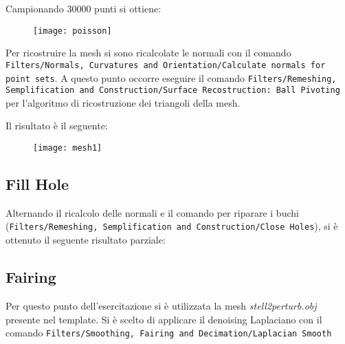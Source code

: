 Campionando 30000 punti si ottiene:
 \begin{figure}[htb]
    \centering
    \texttt{[image: poisson]}
    \caption{\label{fig:poisson}}
    \vspace{-0.3cm}
\end{figure}

Per ricostruire la mesh si sono ricalcolate le normali con il comando \texttt{Filters/\-Normals, \-Curvatures and \-Orientation/\-Calculate normals \-for \-point \-sets}. A questo punto occorre eseguire il comando \texttt{Filters/\-Remeshing, \-Semplification and \-Construction/\-Surface\- Recostruction\-: Ball \-Pivoting} per l'algoritmo di ricostruzione dei triangoli della mesh.

Il risultato è il seguente:
 \begin{figure}[htb]
    \centering
    \texttt{[image: mesh1]}
    \caption{\label{fig:mesh}}
    \vspace{-0.3cm}
\end{figure}

\subsection{Fill Hole}
Alternando il ricalcolo delle normali e il comando per riparare i buchi (\texttt{Filters/\-Remeshing, \-Semplification\- and \-Construction/Close Holes}), si è ottenuto il seguente risultato parziale:
\begin{figure}[hbt]
    \centering
	\vspace{-0.2cm}
\end{figure}


\subsection{Fairing}
Per questo punto dell'esercitazione si è utilizzata la mesh \textit{stell2perturb.obj} presente nel template.
Si è scelto di applicare il denoising Laplaciano con il comando \texttt{Filters/\-Smoothing, \-Fairing \-and \-Decimation/\-Laplacian \-Smooth}

\begin{figure}[hbt]
    \centering
	\vspace{-0.2cm}
\end{figure}




















%


